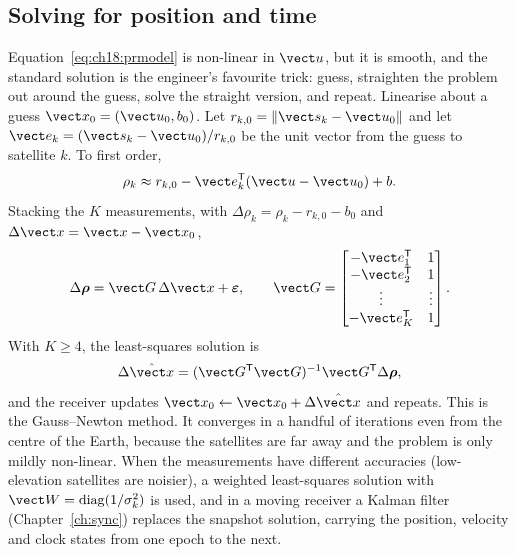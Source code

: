 \subsection{Solving for position and time}

Equation~\eqref{eq:ch18:prmodel} is non-linear in $\vect u$, but it is smooth, and the standard
solution is the engineer's favourite trick: guess, straighten the problem out around the guess,
solve the straight version, and repeat. Linearise about a guess $\vect x_0=(\vect u_0,b_0)$. Let
$r_{k,0}=\|\vect s_k-\vect u_0\|$ and let $\vect e_k=(\vect s_k-\vect u_0)/r_{k,0}$ be the unit
vector from the guess to satellite $k$. To first order,
\begin{equation}
\rho_k\approx r_{k,0}-\vect e_k^{\mathsf T}(\vect u-\vect u_0)+b.
\end{equation}
Stacking the $K$ measurements, with $\Delta\rho_k=\rho_k-r_{k,0}-b_0$ and
$\Delta\vect x=\vect x-\vect x_0$,
\begin{equation}
\Delta\boldsymbol\rho=\vect G\,\Delta\vect x+\boldsymbol\varepsilon,\qquad
\vect G=\begin{bmatrix}-\vect e_1^{\mathsf T}&1\\-\vect e_2^{\mathsf T}&1\\\vdots&\vdots\\-\vect e_K^{\mathsf T}&1\end{bmatrix}.
\label{eq:ch18:linear}
\end{equation}
With $K\ge4$, the least-squares solution is
\begin{equation}
\Delta\hat{\vect x}=(\vect G^{\mathsf T}\vect G)^{-1}\vect G^{\mathsf T}\Delta\boldsymbol\rho,
\label{eq:ch18:ls}
\end{equation}
and the receiver updates $\vect x_0\leftarrow\vect x_0+\Delta\hat{\vect x}$ and repeats. This is
the Gauss--Newton method. It converges in a handful of iterations even from the centre of the
Earth, because the satellites are far away and the problem is only mildly non-linear. When the
measurements have different accuracies (low-elevation satellites are noisier), a weighted
least-squares solution with $\vect W=\operatorname{diag}(1/\sigma_k^2)$ is used, and in a moving
receiver a Kalman filter (Chapter~\ref{ch:sync}) replaces the snapshot solution, carrying the
position, velocity and clock states from one epoch to the next.

